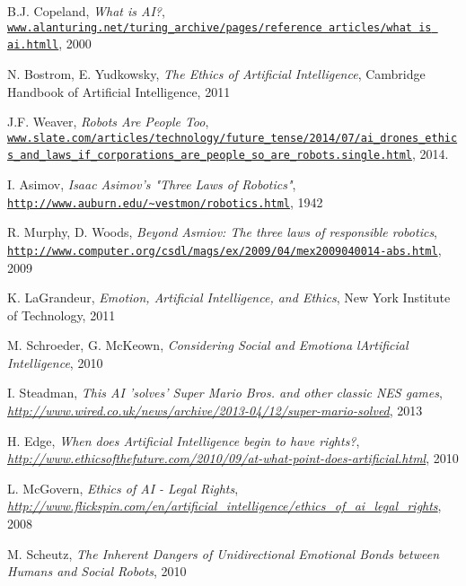 \documentclass[article]{IEEEtran}
\begin{document}
\begin{thebibliography}{9}

B.J. Copeland, \textit{What is AI?},
\\\texttt{\url{www.alanturing.net/turing_archive/pages/reference articles/what is ai.htmll}}, 2000

N. Bostrom, E. Yudkowsky, \textit{The Ethics of Artificial Intelligence},
Cambridge Handbook of Artificial Intelligence, 2011

J.F. Weaver, \textit{Robots Are People Too},
\\\texttt{\url{www.slate.com/articles/technology/future_tense/2014/07/ai_drones_ethics_and_laws_if_corporations_are_people_so_are_robots.single.html}}, 2014.

I. Asimov, \textit{Isaac Asimov's "Three Laws of Robotics"},
\\\texttt{\url{http://www.auburn.edu/~vestmon/robotics.html}}, 1942

R. Murphy, D. Woods, \textit{Beyond Asmiov: The three laws of responsible robotics},
\\\texttt{\url{http://www.computer.org/csdl/mags/ex/2009/04/mex2009040014-abs.html}}, 2009

K. LaGrandeur, \textit{Emotion, Artificial Intelligence, and Ethics},
New York Institute of Technology, 2011

M. Schroeder, G. McKeown, \textit{Considering Social and Emotiona lArtiﬁcial Intelligence}, 2010

I. Steadman, \textit{This AI 'solves' Super Mario Bros. and other classic NES games},
\\\textit{\url{ http://www.wired.co.uk/news/archive/2013-04/12/super-mario-solved}}, 2013

 H. Edge, \textit{When does Artificial Intelligence begin to have rights?},
\\\textit{\url{ http://www.ethicsofthefuture.com/2010/09/at-what-point-does-artificial.html}}, 2010

L. McGovern, \textit{Ethics of AI - Legal Rights},
\\\textit{\url{http://www.flickspin.com/en/artificial_intelligence/ethics_of_ai_legal_rights}}, 2008

M. Scheutz, \textit{The Inherent Dangers of Unidirectional Emotional Bonds between Humans and Social Robots}, 2010


\end{thebibliography}
\end{document}
